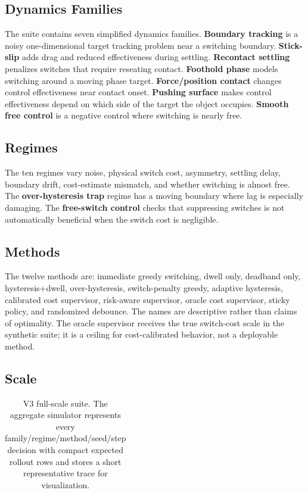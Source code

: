 \documentclass{article}
\begin{document}
\subsection{Dynamics Families}

The suite contains seven simplified dynamics families.
\textbf{Boundary tracking} is a noisy one-dimensional target tracking problem near a switching boundary.
\textbf{Stick-slip} adds drag and reduced effectiveness during settling.
\textbf{Recontact settling} penalizes switches that require reseating contact.
\textbf{Foothold phase} models switching around a moving phase target.
\textbf{Force/position contact} changes control effectiveness near contact onset.
\textbf{Pushing surface} makes control effectiveness depend on which side of the target the object occupies.
\textbf{Smooth free control} is a negative control where switching is nearly free.

\subsection{Regimes}

The ten regimes vary noise, physical switch cost, asymmetry, settling delay, boundary drift, cost-estimate mismatch, and whether switching is almost free.
The \textbf{over-hysteresis trap} regime has a moving boundary where lag is especially damaging.
The \textbf{free-switch control} checks that suppressing switches is not automatically beneficial when the switch cost is negligible.

\subsection{Methods}

The twelve methods are:
immediate greedy switching, dwell only, deadband only, hysteresis+dwell, over-hysteresis, switch-penalty greedy, adaptive hysteresis, calibrated cost supervisor, risk-aware supervisor, oracle cost supervisor, sticky policy, and randomized debounce.
The names are descriptive rather than claims of optimality.
The oracle supervisor receives the true switch-cost scale in the synthetic suite; it is a ceiling for cost-calibrated behavior, not a deployable method.

\subsection{Scale}

\begin{table}[t]
\centering
\caption{V3 full-scale suite. The aggregate simulator represents every family/regime/method/seed/step decision with compact expected rollout rows and stores a short representative trace for visualization.}
\label{tab:scale}
\begin{tabular}{lrrrrr}
\toprule

\end{tabular}
\end{table}
\end{document}
